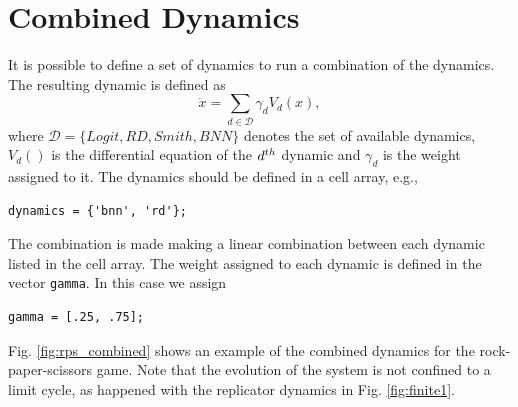 \FloatBarrier
\section{Combined Dynamics} \label{sec:combined}

It is possible to define a set of dynamics to run a combination of the dynamics. 
The resulting dynamic is defined as 
\begin{equation}
\dot{ x } = \sum_{d\in \mathcal{D}} \gamma_d V_d( x ),
\end{equation}
where $\mathcal{D}=\{ Logit, RD, Smith, BNN \}$ denotes the set of available dynamics, $V_d()$ is the differential equation of the $d^{th}$ dynamic and $\gamma_d$ is the weight assigned to it.
The dynamics should be defined in a cell array, e.g., 
\begin{lstlisting}
dynamics = {'bnn', 'rd'};
\end{lstlisting}
The combination is made making a linear combination between each dynamic listed in the cell array. The weight assigned to each dynamic is defined in the vector \verb|gamma|. In this case we assign 
\begin{lstlisting}
gamma = [.25, .75]; 
\end{lstlisting}

Fig. \ref{fig:rps_combined} shows an example of the combined dynamics for the rock-paper-scissors game. Note that the evolution of the system is not confined to a limit cycle, as happened with the replicator dynamics in Fig.  \ref{fig:finite1}.

